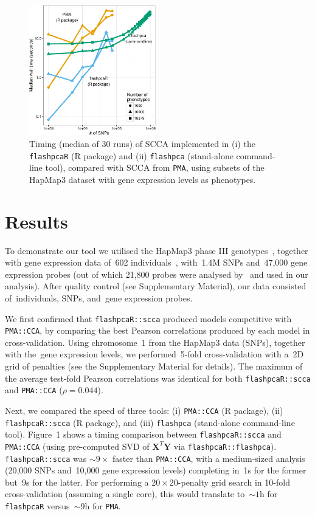 \documentclass{bioinfo}
\begin{document}
\begin{figure}[!tpb]
\centerline{\includegraphics[width=0.49\textwidth]{scca_timing-crop.pdf}}
\caption{
Timing (median of 30 runs) of SCCA implemented in (i) the \texttt{flashpcaR}
(\textsf{R} package) and (ii) \texttt{flashpca} (stand-alone command-line tool),
compared with SCCA from \texttt{PMA}, using subsets of the HapMap3 dataset with gene
expression levels as phenotypes.
}
\label{fig:01}
\end{figure}

\section{Results}

To demonstrate our tool we utilised the HapMap3 phase III
genotypes~\citep{hapmap2010}, together with gene expression data of~602
individuals~\citep{Stranger2012}, with~1.4M SNPs and~47,000 gene expression
probes (out of which 21,800 probes were analysed by~\citet{Stranger2012} and
used in our analysis). After quality control (see Supplementary Material),
our data consisted of~\nindiv individuals, \nsnps SNPs, and~\ngenes gene
expression probes.

We first confirmed that \texttt{flashpcaR::scca} produced models competitive
with \texttt{PMA::CCA}, by comparing the best Pearson correlations produced
by each model in cross-validation.  Using chromosome~1 from the HapMap3
data (\nsnpschr SNPs), together with the~\ngenes gene expression levels,
we performed~5-fold cross-validation with a~2D grid of penalties (see the
Supplementary Material for details). The maximum of the average test-fold
Pearson correlations was identical for both \texttt{flashpcaR::scca} and
\texttt{PMA::CCA} ($\rho=0.044$).

Next, we compared the speed of three tools: (i) \texttt{PMA::CCA} (\textsf{R}
package), (ii) \texttt{flashpcaR::scca} (\textsf{R} package), and (iii)
\texttt{flashpca} (stand-alone command-line tool).
Figure~1\vphantom{\ref{fig:01}} shows a timing comparison between
\texttt{flashpcaR::scca} and \texttt{PMA::CCA} (using pre-computed SVD of
$\mathbf{X}^T \mathbf{Y}$ via \texttt{flashpcaR::flashpca}).
\texttt{flashpcaR::scca} was ${\sim}9\times$ faster than \texttt{PMA::CCA}, with
a medium-sized analysis (20,000 SNPs and~10,000 gene expression levels)
completing in~1s for the former but~9s for the latter.  For performing a
$20\times20$-penalty grid search in 10-fold cross-validation (assuming a single
core), this would translate to~${\sim}1$h for \texttt{flashpcaR}
versus~${\sim}9$h for \texttt{PMA}.
\end{document}
